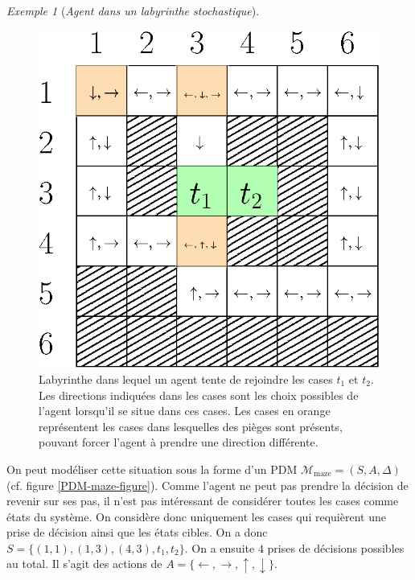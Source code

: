\documentclass[12pt,a4paper]{report}
\theoremstyle{definition}%
\theoremstyle{remark}
\newtheorem{example}{Exemple}[chapter]
\begin{document}
\begin{example}[\textit{Agent dans un labyrinthe stochastique}]
\begin{figure}[H]
		\includegraphics[scale=0.8]{figures/maze}
		\caption{Labyrinthe dans lequel un agent tente de rejoindre les cases $t_1$ et $t_2$.
			Les directions indiquées dans les cases sont les choix possibles de
			l'agent lorsqu'il se situe dans ces cases. Les cases en orange
			représentent les cases dans lesquelles des pièges sont présents, pouvant
			forcer l'agent à prendre une direction différente.}
		\label{maze-figure}
	\end{figure}
	On peut modéliser cette situation sous la forme d'un PDM
	$\mathcal{M}_{\text{maze}} = (S, A, \Delta)$ (cf. figure \ref{PDM-maze-figure}). Comme l'agent ne peut pas
	prendre la décision de revenir sur ses pas, il n'est pas intéressant de considérer
	toutes les cases comme états du système. On considère donc uniquement les
	cases qui requièrent une prise de décision ainsi que les états cibles.
	On a donc
	$S = \{ (1,1), (1,3), (4,3), t_1, t_2 \}$. On a ensuite $4$ prises de
	décisions possibles au total. Il s'agit des actions de $A = \{ \leftarrow,
	\rightarrow, \uparrow, \downarrow \}$.
	\begin{figure}[H]
		\centering
		\captionsetup{justification=centering}

\end{figure}
\end{example}
\end{document}
